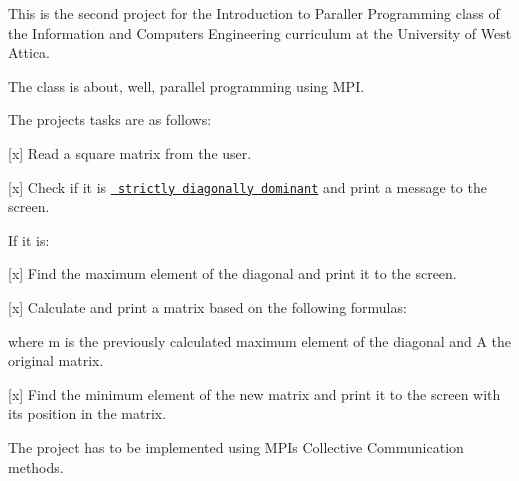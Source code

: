This is the second project for the Introduction to Paraller Programming class of the Information and Computers Engineering curriculum at the University of West Attica.

The class is about, well, parallel programming using M\+PI.

The project\textquotesingle{}s tasks are as follows\+:


\begin{DoxyItemize}
\item \mbox{[}x\mbox{]} Read a square matrix from the user.
\item \mbox{[}x\mbox{]} Check if it is \href{https://en.wikipedia.org/wiki/Diagonally_dominant_matrix}{\texttt{ strictly diagonally dominant}} and print a message to the screen.
\end{DoxyItemize}

If it is\+:


\begin{DoxyItemize}
\item \mbox{[}x\mbox{]} Find the maximum element of the diagonal and print it to the screen.
\item \mbox{[}x\mbox{]} Calculate and print a matrix based on the following formulas\+:
\end{DoxyItemize}

 

 

where {\ttfamily m} is the previously calculated maximum element of the diagonal and {\ttfamily A} the original matrix.


\begin{DoxyItemize}
\item \mbox{[}x\mbox{]} Find the minimum element of the new matrix and print it to the screen with it\textquotesingle{}s position in the matrix.
\end{DoxyItemize}

The project has to be implemented using M\+PI\textquotesingle{}s Collective Communication methods. 